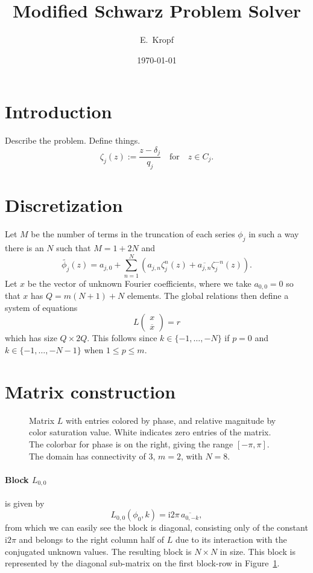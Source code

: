 \documentclass[12pt,a4paper,fleqn]{article}
\title{Modified Schwarz Problem Solver}
\author{E.~Kropf}
\date{\today}
\newcommand{\conj}[1]{\overline{#1}}
\renewcommand{\i}{\mathrm{i}}
\begin{document}
\maketitle

\section{Introduction}
Describe the problem. Define things.
\begin{equation}
  \zeta_j(z) := \frac{z - \delta_j}{q_j} \quad \text{for} \quad z\in C_j.
\end{equation}

\section{Discretization}
Let $M$ be the number of terms in the truncation of each series $\phi_j$ in such a way there is an $N$ such that $M = 1 + 2N$ and
\begin{equation}
\tilde{\phi_j}(z) = a_{j,0} + \sum_{n=1}^N \left( a_{j,n} \zeta_j^n(z) + \conj{a_{j,n}} \zeta_j^{-n}(z) \right).
  \label{eq:discrete_uknown}
\end{equation}
Let $x$ be the vector of unknown Fourier coefficients, where we take $a_{0,0} = 0$ so that $x$ has $Q = m(N+1) + N$ elements. The global relations then define a system of equations
\begin{equation}
  L
  \begin{pmatrix}
    x \\
    \conj{x}
  \end{pmatrix}
  = r
  \label{eq:base_linear_system}
\end{equation}
which has size $Q\times 2Q$. This follows since $k\in\{-1,\dots,-N\}$ if $p = 0$ and $k\in\{-1,\dots,-N-1\}$ when $1\le p\le m$.

\section{Matrix construction}
\begin{figure}[htbp]
  \centering
  \caption{Matrix $L$ with entries colored by phase, and relative magnitude by color saturation value. White indicates zero entries of the matrix. The colorbar for phase is on the right, giving the range $[-\pi,\pi]$. The domain has connectivity of 3, $m = 2$, with $N = 8$.}
  \label{fig:L_matrix}
\end{figure}

\paragraph{Block $L_{0,0}$} is given by
\begin{equation}
  L_{0,0}(\phi_0,k) = \i2\pi \,\conj{a_{0,-k}},
  \label{eq:block_L00}
\end{equation}
from which we can easily see the block is diagonal, consisting only of the constant $\i2\pi$ and belongs to the right column half of $L$ due to its interaction with the conjugated unknown values. The resulting block is $N\times N$ in size. This block is represented by the diagonal sub-matrix on the first block-row in Figure~\ref{fig:L_matrix}.
\end{document}
